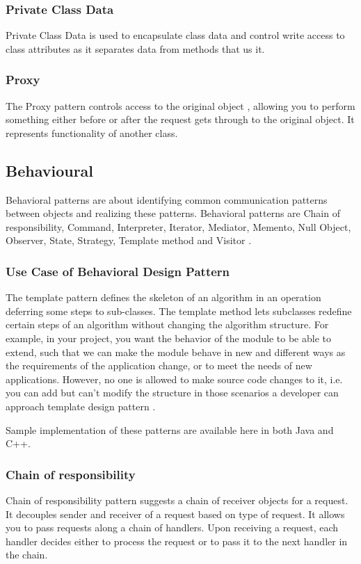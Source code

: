 \documentclass[sigplan,12pt,nonacm=true,review=false]{acmart}
\begin{document}
\subsubsection{Private Class Data}
Private Class Data is used to encapsulate class data and control write access to class attributes as it separates data from methods that us it. 

\subsubsection{Proxy}
The Proxy pattern controls access to the original object \cite{wendorff_assessment_2001}, allowing you to perform something either before or after the request gets through to the original object. It represents functionality of another class.

\subsection{Behavioural}
Behavioral patterns are about identifying common communication patterns between objects and realizing these patterns. Behavioral patterns are Chain of responsibility, Command, Interpreter, Iterator, Mediator, Memento, Null Object, Observer, State, Strategy, Template method and Visitor \cite{kuchana_software_2004, zimmer_relationships_1995}.

\subsubsection{Use Case of Behavioral Design Pattern}
The template pattern defines the skeleton of an algorithm in an operation deferring some steps to sub-classes. The template method lets subclasses redefine certain steps of an algorithm without changing the algorithm structure. For example, in your project, you want the behavior of the module to be able to extend, such that we can make the module behave in new and different ways as the requirements of the application change, or to meet the needs of new applications. However, no one is allowed to make source code changes to it, i.e. you can add but can’t modify the structure in those scenarios a developer can approach template design pattern \cite{noauthor_design_nodate, noauthor_design_2015}.

Sample implementation of these patterns \cite{noauthor_huston_nodate} are available here in both Java and C++.

\subsubsection{Chain of responsibility}
Chain of responsibility pattern suggests a chain of receiver objects for a request. It decouples sender and receiver of a request based on type of request. It allows you to pass requests along a chain of handlers. Upon receiving a request, each handler decides either to process the request or to pass it to the next handler in the chain.
\end{document}

